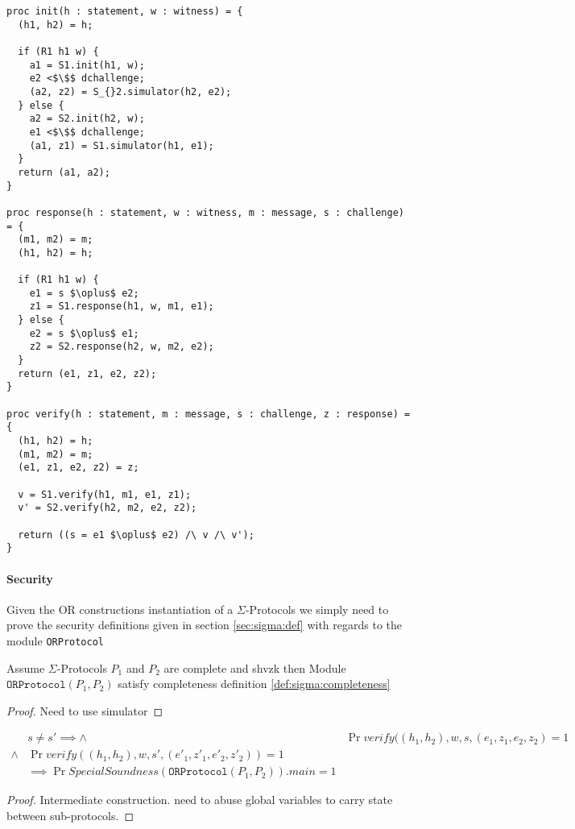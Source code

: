 \begin{lstlisting}[float, mathescape, label=lst:sigma:or,caption=OR construction]
proc init(h : statement, w : witness) = {
  (h1, h2) = h;

  if (R1 h1 w) {
    a1 = S1.init(h1, w);
    e2 <$\$$ dchallenge;
    (a2, z2) = S_{}2.simulator(h2, e2);
  } else {
    a2 = S2.init(h2, w);
    e1 <$\$$ dchallenge;
    (a1, z1) = S1.simulator(h1, e1);
  }
  return (a1, a2);
}

proc response(h : statement, w : witness, m : message, s : challenge) = {
  (m1, m2) = m;
  (h1, h2) = h;

  if (R1 h1 w) {
    e1 = s $\oplus$ e2;
    z1 = S1.response(h1, w, m1, e1);
  } else {
    e2 = s $\oplus$ e1;
    z2 = S2.response(h2, w, m2, e2);
  }
  return (e1, z1, e2, z2);
}

proc verify(h : statement, m : message, s : challenge, z : response) = {
  (h1, h2) = h;
  (m1, m2) = m;
  (e1, z1, e2, z2) = z;

  v = S1.verify(h1, m1, e1, z1);
  v' = S2.verify(h2, m2, e2, z2);

  return ((s = e1 $\oplus$ e2) /\ v /\ v');
}
\end{lstlisting}


\paragraph{Security}
Given the OR constructions instantiation of a $\Sigma$-Protocols we simply need
to prove the security definitions given in section \ref{sec:sigma:def} with
regards to the module \texttt{ORProtocol}

\begin{lemma}[OR Completeness]
  Assume $\Sigma$-Protocols $P_{1}$ and $P_{2}$ are complete and shvzk then
  Module $\texttt{ORProtocol}(P_1, P_2)$ satisfy completeness definition \ref{def:sigma:completeness}
\end{lemma}
\begin{proof}
  Need to use simulator
\end{proof}

\begin{lemma}
  \begin{align*}
    & s \neq s' \implies
    \land &\Pr{verify((h_{1}, h_{2}), w, s, (e_{1}, z_{1}, e_{2}, z_{2})} = 1 \\
    \land &\Pr{verify((h_{1}, h_{2}), w, s', (e'_{1}, z'_{1}, e'_{2}, z'_{2}))} = 1 \\
    &\implies \Pr{SpecialSoundness(\texttt{ORProtocol}(P_{1}, P_{2})).main} = 1
  \end{align*}
\end{lemma}
\begin{proof}
  Intermediate construction. need to abuse global variables to carry state
  between sub-protocols.
\end{proof}

